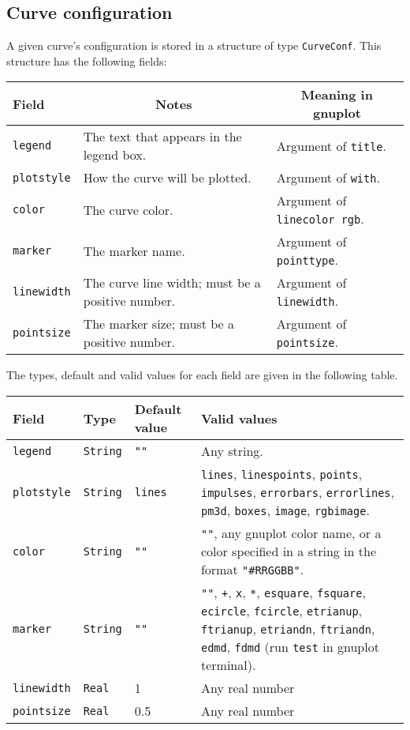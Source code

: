 \documentclass[11pt]{article}
\newcommand{\cmd}[1]{\texttt{#1}}
\begin{document}
\subsection{Curve configuration}

A given curve's configuration is stored in a structure of type \cmd{CurveConf}.
This structure has the following fields:

{\small
\begin{center}
\begin{tabular}{lll}
	\toprule
	\textbf{Field} & \multicolumn{1}{c}{\textbf{Notes}} &
	\multicolumn{1}{c}{\textbf{Meaning in gnuplot}} \\
	\midrule
	\cmd{legend} & The text that appears in the legend box. & Argument of
	\cmd{title}. \\
	\cmd{plotstyle} & How the curve will be plotted. & Argument of \cmd{with}.
	\\
	\cmd{color} & The curve color. & Argument of \cmd{linecolor rgb}. \\
	\cmd{marker} & The marker name. & Argument of \cmd{pointtype}. \\
	\cmd{linewidth} & The curve line width; must be a positive number. &
	Argument of \cmd{linewidth}. \\
	\cmd{pointsize} & The marker size; must be a positive number. & Argument
	of \cmd{pointsize}. \\
	\bottomrule
\end{tabular}
\end{center}}

The types, default and valid values for each field are given in the following
table.

{\small
\begin{center}
	\begin{tabular}{lp{1.5cm}p{2cm}p{7.5cm}}
	\toprule
	\textbf{Field} & \textbf{Type} & \textbf{Default value} & \textbf{Valid values} \\
	\midrule
	\cmd{legend} & \cmd{String} & \cmd{""} & Any string. \\
	\cmd{plotstyle} & \cmd{String} & \cmd{lines} & \cmd{lines}, \cmd{linespoints},
	\cmd{points}, \cmd{impulses}, \cmd{errorbars}, \cmd{errorlines},
	\cmd{pm3d}, \cmd{boxes}, \cmd{image}, \cmd{rgbimage}. \\
	\cmd{color} & \cmd{String} & \cmd{""} & \cmd{""}, any gnuplot color name,
	or a color specified in a string in the format \cmd{"\#RRGGBB"}. \\
	\cmd{marker} & \cmd{String} & \cmd{""} & \cmd{""}, \cmd{+}, \cmd{x}, \cmd{*}, \cmd{esquare},
	\cmd{fsquare}, \cmd{ecircle}, \cmd{fcircle}, \cmd{etrianup},
	\cmd{ftrianup}, \cmd{etriandn}, \cmd{ftriandn}, \cmd{edmd}, \cmd{fdmd} (run
	\cmd{test} in gnuplot terminal). \\
	\cmd{linewidth} & \cmd{Real} & 1 & Any real number \\
	\cmd{pointsize} & \cmd{Real} & 0.5 & Any real number \\
	\bottomrule
\end{tabular}
\end{center}}
\end{document}
